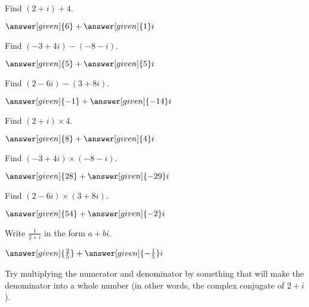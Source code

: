 \documentclass[nooutcomes]{ximera}
\begin{document}
\begin{problem}
Find $(2+i) + 4$.
\begin{prompt}
	$\answer[given]{6} + \answer[given]{1}i$
\end{prompt}
\end{problem}


\begin{problem}
Find $(-3+4i) - (-8 - i)$.
\begin{prompt}
	$\answer[given]{5} + \answer[given]{5}i$
\end{prompt}
\end{problem}


\begin{problem}
Find $(2-6i) - (3+8i)$.
\begin{prompt}
	$\answer[given]{-1} + \answer[given]{-14}i$
\end{prompt}
\end{problem}




\begin{problem}
Find $(2+i) \times 4$.
\begin{prompt}
	$\answer[given]{8} + \answer[given]{4}i$
\end{prompt}
\end{problem}



\begin{problem}
Find $(-3 + 4i) \times (-8 - i)$.
\begin{prompt}
	$\answer[given]{28} + \answer[given]{-29}i$
\end{prompt}
\end{problem}




\begin{problem}
Find $(2-6i) \times (3+8i)$.
\begin{prompt}
	$\answer[given]{54} + \answer[given]{-2}i$
\end{prompt}
\end{problem}




\begin{problem}
Write $\frac{1}{2+i}$ in the form $a + bi$.
\begin{prompt}
	$\answer[given]{\frac{2}{5}} + \answer[given]{-\frac{1}{5}}i$
\end{prompt}
\begin{hint}
Try multiplying the numerator and denominator by something that will make the denominator into a whole number (in other words, the complex conjugate of $2+i$).
\end{hint}

\end{problem}
\end{document}

